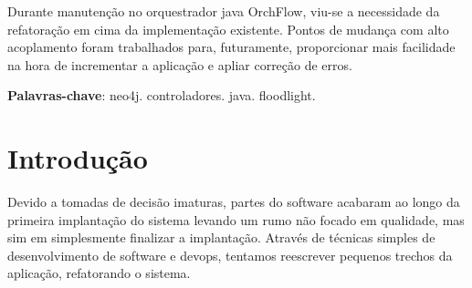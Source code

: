 \documentclass[
	article,			%
	11pt,				%
	oneside,			%
	a4paper,			%
	english,			%
	brazil,				%
	sumario=tradicional
	]{abntex2}
\begin{document}

\frenchspacing


%
%
\maketitle

\begin{resumoumacoluna}
  Durante manutenção no orquestrador java OrchFlow, viu-se a necessidade da refatoração em cima da implementação existente. Pontos de mudança com alto acoplamento foram trabalhados para, futuramente, proporcionar mais facilidade na hora de incrementar a aplicação e apliar correção de erros.

 \vspace{\onelineskip}

 \noindent
 \textbf{Palavras-chave}: neo4j. controladores. java. floodlight.
\end{resumoumacoluna}


\textual

\section*{Introdução}

Devido a tomadas de decisão imaturas, partes do software acabaram ao longo da primeira implantação do sistema levando um rumo não focado em qualidade, mas sim em simplesmente finalizar a implantação.
Através de técnicas simples de desenvolvimento de software e devops, tentamos reescrever pequenos trechos da aplicação, refatorando o sistema.
\end{document}
